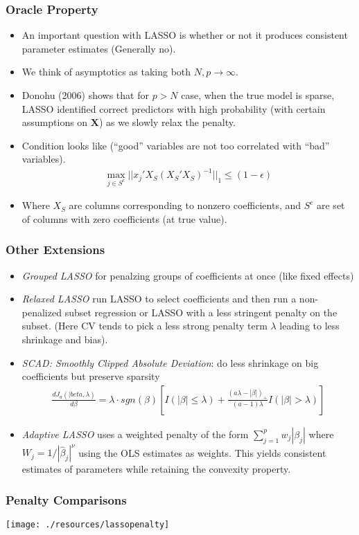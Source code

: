 \documentclass[xcolor=pdftex,dvipsnames,table,mathserif,aspectratio=169]{beamer}
\begin{document}
\begin{frame}
\frametitle{Oracle Property}
\begin{itemize}
\item An important question with LASSO is whether or not it produces consistent parameter estimates (Generally \alert{no}).
\item We think of asymptotics as taking both $N,p\rightarrow \infty$.
\item Donohu (2006) shows that for $p > N$ case, when the true model is sparse, LASSO identified correct predictors with high probability (with certain assumptions on $\mathbf{X}$) as we slowly relax the penalty.
\item Condition looks like (``good'' variables are not too correlated with ``bad'' variables).
\begin{eqnarray*}
\max_{j \in S^{c}} || x_j' X_{S} (X_{S}' X_{S})^{-1} ||_{1} \leq (1 -\epsilon) 
\end{eqnarray*}
\item Where $X_{S}$ are columns corresponding to nonzero coefficients, and $S^{c}$ are set of columns with zero coefficients (at true value).
\end{itemize}
\end{frame}


\begin{frame}
\frametitle{Other Extensions}
\begin{itemize}
\item \textit{Grouped LASSO} for penalzing groups of coefficients at once (like fixed effects)
\item \textit{Relaxed LASSO} run LASSO to select coefficients and then run a non-penalized subset regression or LASSO with a less stringent penalty on the subset. (Here CV tends to pick a less strong penalty term $\lambda$ leading to less shrinkage and bias).
\item \textit{SCAD: Smoothly Clipped Absolute Deviation}: do less shrinkage on big coefficients but preserve sparsity
\begin{eqnarray*}
\frac{ d J_a(|beta,\lambda)}{d \beta} = \lambda \cdot sgn(\beta) \left[ I(| \beta| \leq \lambda) + \frac{(a \lambda - | \beta|)_{+}}{(a-1) \lambda} I (| \beta| > \lambda) \right]
\end{eqnarray*}
\item \textit{Adaptive LASSO} uses  a weighted penalty of the form $\sum_{j=1}^p w_j |\beta_j|$ where $W_j = 1/|\hat{\beta}_j|^{\nu}$ using the OLS estimates as weights. This yields consistent estimates of parameters while retaining the convexity property.
\end{itemize}
\end{frame}

\begin{frame}
\frametitle{Penalty Comparisons}
\begin{center}
\texttt{[image: ./resources/lassopenalty]}
\end{center}
\end{frame}
\end{document}
